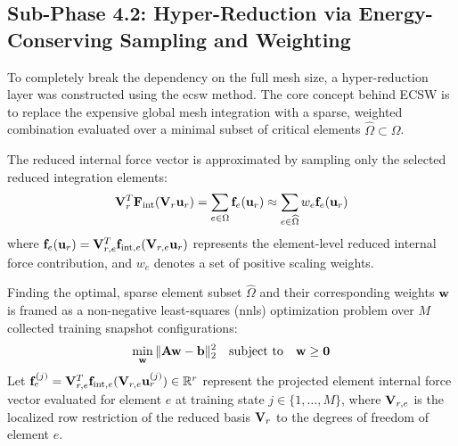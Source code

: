 \subsection{Sub-Phase 4.2: Hyper-Reduction via Energy-Conserving Sampling and Weighting}
\label{subsec:ecsw_logic}

To completely break the dependency on the full mesh size, a hyper-reduction layer was constructed using the \acrlong{ecsw} method. The core concept behind ECSW is to replace the expensive global mesh integration with a sparse, weighted combination evaluated over a minimal subset of critical elements $\widehat{\Omega} \subset \Omega$.

The reduced internal force vector is approximated by sampling only the selected reduced integration elements:
\begin{equation}
    \mathbf{V}_r^T \mathbf{F}_{\text{int}}(\mathbf{V}_r \mathbf{u}_r) = \sum_{e \in \Omega} \mathbf{f}_e(\mathbf{u}_r) \approx \sum_{e \in \widehat{\Omega}} w_e \mathbf{f}_e(\mathbf{u}_r)
\end{equation}
where $\mathbf{f}_e(\mathbf{u}_r) = \mathbf{V}_{r,e}^T \mathbf{f}_{\text{int},e}(\mathbf{V}_{r,e} \mathbf{u}_r)$ represents the element-level reduced internal force contribution, and $w_e$ denotes a set of positive scaling weights.

Finding the optimal, sparse element subset $\widehat{\Omega}$ and their corresponding weights $\mathbf{w}$ is framed as a non-negative least-squares (\acrshort{nnls}) optimization problem over $M$ collected training snapshot configurations:
\begin{equation}
    \min_{\mathbf{w}} \|\mathbf{A}\mathbf{w} - \mathbf{b}\|_2^2 \quad \text{subject to} \quad \mathbf{w} \ge \mathbf{0}
\end{equation}
Let $\mathbf{f}_e^{(j)} = \mathbf{V}_{r,e}^T \mathbf{f}_{\text{int},e}(\mathbf{V}_{r,e} \mathbf{u}_r^{(j)}) \in \mathbb{R}^r$ represent the projected element internal force vector evaluated for element $e$ at training state $j \in \{1, \dots, M\}$, where $\mathbf{V}_{r,e}$ is the localized row restriction of the reduced basis $\mathbf{V}_r$ to the degrees of freedom of element $e$.


